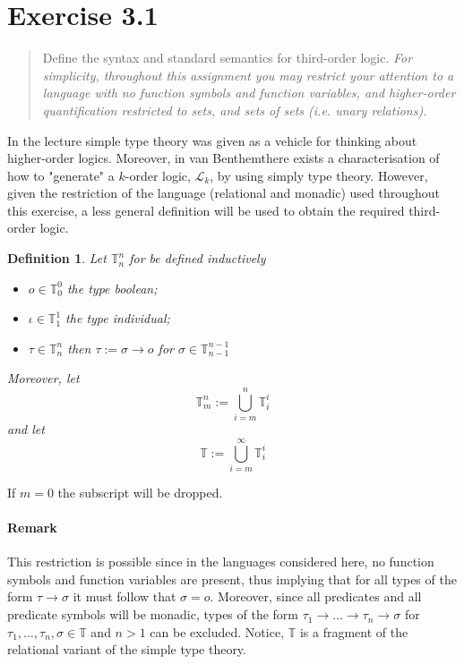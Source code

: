 \documentclass[11pt,a4paper]{article}
\newtheorem{mydef}{Definition}
\newcommand{\vanB}{van Benthem}
\begin{document}


\section*{Exercise 3.1}
\begin{quote}
Define the syntax and standard semantics for third-order logic. \emph{For simplicity, throughout this assignment you may restrict your attention to a language with no function symbols and function variables, and higher-order quantification restricted to sets, and sets of sets (i.e. unary relations).}
\end{quote}

In the lecture simple type theory was given as a vehicle for thinking about higher-order logics. Moreover, in \vanB there exists a characterisation of how to "generate" a $k$-order logic, $\mathcal{L}_k$, by using simply type theory. However, given the restriction of the language (relational and monadic) used throughout this exercise, a less general definition will be used to obtain the required third-order logic.


\begin{mydef}
Let $\mathbb{T}_n^n$ for be defined inductively
\begin{itemize}
\item $o \in \mathbb{T}_0^0$ the type boolean;
\item $\iota \in \mathbb{T}_1^1$ the type individual;
\item $\tau \in \mathbb{T}_n^n$ then $\tau:= \sigma \to o$ for $\sigma \in \mathbb{T}_{n-1}^{n-1}$
\end{itemize}
Moreover, let 
\begin{equation*}
\mathbb{T}_m^n:= \bigcup_{i = m}^n  \mathbb{T}_i^i
\end{equation*}
and let
\begin{equation*}
\mathbb{T}:= \bigcup_{i = m}^{\infty} \mathbb{T}_i^i
\end{equation*}
\end{mydef}

If $m=0$ the subscript will be dropped.

\paragraph*{Remark} This restriction is possible since in the languages considered here, no function symbols and function variables are present, thus implying that for all types of the form $\tau \to \sigma$ it must follow that $\sigma=o$. Moreover, since all predicates and all predicate symbols will be monadic, types of the form $\tau_1 \to \dots \to \tau_n \to \sigma$ for $\tau_1, \dots, \tau_n, \sigma \in \mathbb{T}$ and $n >1$ can be excluded. Notice, $\mathbb{T}$ is a fragment of the relational variant of the simple type theory. \\
\end{document}
